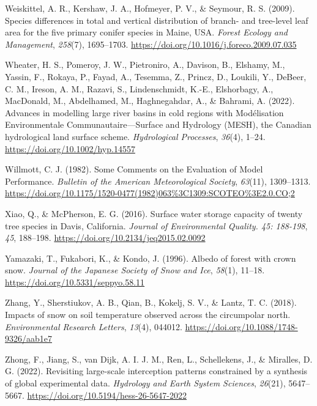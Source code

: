 \documentclass[
  letterpaper,
]{tex/uofsthesis-cs}
\newlength{\cslhangindent}
\newenvironment{CSLReferences}[2] %
 {\begin{list}{}{%
  \setlength{\itemindent}{0pt}
  \setlength{\leftmargin}{0pt}
  \setlength{\parsep}{0pt}
  \ifodd #1
   \setlength{\leftmargin}{\cslhangindent}
   \setlength{\itemindent}{-1\cslhangindent}
  \fi
  \setlength{\itemsep}{#2\baselineskip}}}
 {\end{list}}
\begin{document}
\begin{CSLReferences}{1}{0}
Weiskittel, A. R., Kershaw, J. A., Hofmeyer, P. V., \& Seymour, R. S.
(2009). Species differences in total and vertical distribution of
branch- and tree-level leaf area for the five primary conifer species in
{Maine}, {USA}. \emph{Forest Ecology and Management}, \emph{258}(7),
1695--1703. \url{https://doi.org/10.1016/j.foreco.2009.07.035}

Wheater, H. S., Pomeroy, J. W., Pietroniro, A., Davison, B., Elshamy,
M., Yassin, F., Rokaya, P., Fayad, A., Tesemma, Z., Princz, D., Loukili,
Y., DeBeer, C. M., Ireson, A. M., Razavi, S., Lindenschmidt, K.-E.,
Elshorbagy, A., MacDonald, M., Abdelhamed, M., Haghnegahdar, A., \&
Bahrami, A. (2022). Advances in modelling large river basins in cold
regions with {Modélisation Environmentale Communautaire}---{Surface} and
{Hydrology} ({MESH}), the {Canadian} hydrological land surface scheme.
\emph{Hydrological Processes}, \emph{36}(4), 1--24.
\url{https://doi.org/10.1002/hyp.14557}

Willmott, C. J. (1982). Some {Comments} on the {Evaluation} of {Model
Performance}. \emph{Bulletin of the American Meteorological Society},
\emph{63}(11), 1309--1313.
\url{https://doi.org/10.1175/1520-0477(1982)063\%3C1309:SCOTEO\%3E2.0.CO;2}

Xiao, Q., \& McPherson, E. G. (2016). Surface water storage capacity of
twenty tree species in {Davis}, {California}. \emph{Journal of
Environmental Quality. 45: 188-198}, \emph{45}, 188--198.
\url{https://doi.org/10.2134/jeq2015.02.0092}

Yamazaki, T., Fukabori, K., \& Kondo, J. (1996). Albedo of forest with
crown snow. \emph{Journal of the Japanese Society of Snow and Ice},
\emph{58}(1), 11--18. \url{https://doi.org/10.5331/seppyo.58.11}

Zhang, Y., Sherstiukov, A. B., Qian, B., Kokelj, S. V., \& Lantz, T. C.
(2018). Impacts of snow on soil temperature observed across the
circumpolar north. \emph{Environmental Research Letters}, \emph{13}(4),
044012. \url{https://doi.org/10.1088/1748-9326/aab1e7}

Zhong, F., Jiang, S., van Dijk, A. I. J. M., Ren, L., Schellekens, J.,
\& Miralles, D. G. (2022). Revisiting large-scale interception patterns
constrained by a synthesis of global experimental data. \emph{Hydrology
and Earth System Sciences}, \emph{26}(21), 5647--5667.
\url{https://doi.org/10.5194/hess-26-5647-2022}

\end{CSLReferences}
\end{document}
